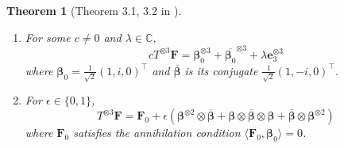\documentclass[11pt]{article}
\newtheorem{theorem}{Theorem}[section]
\newcommand{\teh}{^{\otimes 3}}
\newcommand{\transpose}{^\intercal}
\begin{document}
\begin{theorem}[Theorem 3.1, 3.2 in \cite{cai_dichotomy_2013}]
\begin{enumerate}
\[    \]
  \item 
    For some $c \ne 0$ and $\lambda \in \mathbb{C}$,
    \[
      c T\teh \mathbf{F} =  \boldsymbol{\beta}_0\teh + \overline{\boldsymbol{\beta}_0}\teh + \lambda \mathbf{e}_3 \teh  
    \]
    where $\boldsymbol{\beta}_0 = \frac{1}{\sqrt{2}}(1, i, 0)\transpose$ and $\overline{\boldsymbol{\beta}}$ is its conjugate $\frac{1}{\sqrt{2}}(1, -i, 0)\transpose$.
  \item 
    For $\epsilon \in \{0, 1\}$,
    \[
     T\teh \mathbf{F} = 
     \mathbf{F}_0 + \epsilon \left( \boldsymbol{\beta}^{\otimes 2} \otimes \overline{\boldsymbol{\beta}} + \boldsymbol{\beta} \otimes \overline{\boldsymbol{\beta}} \otimes \boldsymbol{\beta} + \overline{\boldsymbol{\beta}} \otimes \boldsymbol{\beta}^{\otimes 2}\right)
    \]
    where $\mathbf{F}_0$ satisfies the annihilation condition $\langle \mathbf{F}_0, \boldsymbol{\beta}_0 \rangle = 0$.
\end{enumerate}
\end{theorem}
\end{document}
